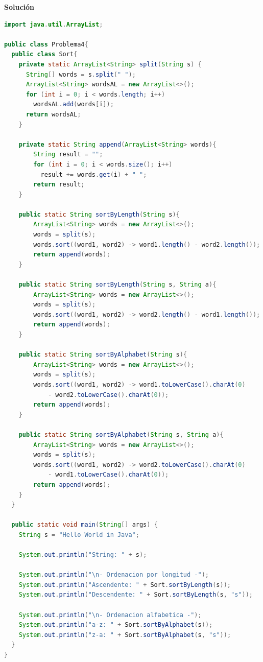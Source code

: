 \documentclass[11pt, twocolumn]{article}
\begin{document}
  \textbf{Solución}
  \begin{lstlisting}[language=Java]
import java.util.ArrayList;

public class Problema4{
  public class Sort{
    private static ArrayList<String> split(String s) {
      String[] words = s.split(" ");
      ArrayList<String> wordsAL = new ArrayList<>();
      for (int i = 0; i < words.length; i++)
        wordsAL.add(words[i]);
      return wordsAL;
    }

    private static String append(ArrayList<String> words){
        String result = "";
        for (int i = 0; i < words.size(); i++)
          result += words.get(i) + " ";
        return result;
    }

    public static String sortByLength(String s){
        ArrayList<String> words = new ArrayList<>();
        words = split(s);
        words.sort((word1, word2) -> word1.length() - word2.length());
        return append(words);
    }

    public static String sortByLength(String s, String a){
        ArrayList<String> words = new ArrayList<>();
        words = split(s);
        words.sort((word1, word2) -> word2.length() - word1.length());
        return append(words);
    }

    public static String sortByAlphabet(String s){
        ArrayList<String> words = new ArrayList<>();
        words = split(s);
        words.sort((word1, word2) -> word1.toLowerCase().charAt(0) 
            - word2.toLowerCase().charAt(0));
        return append(words);
    }

    public static String sortByAlphabet(String s, String a){
        ArrayList<String> words = new ArrayList<>();
        words = split(s);
        words.sort((word1, word2) -> word2.toLowerCase().charAt(0) 
            - word1.toLowerCase().charAt(0));
        return append(words);
    }
  }

  public static void main(String[] args) {
    String s = "Hello World in Java";

    System.out.println("String: " + s);
    
    System.out.println("\n- Ordenacion por longitud -");
    System.out.println("Ascendente: " + Sort.sortByLength(s));
    System.out.println("Descendente: " + Sort.sortByLength(s, "s"));
    
    System.out.println("\n- Ordenacion alfabetica -");
    System.out.println("a-z: " + Sort.sortByAlphabet(s));
    System.out.println("z-a: " + Sort.sortByAlphabet(s, "s"));
  }
}    
  \end{lstlisting}
\end{document}
